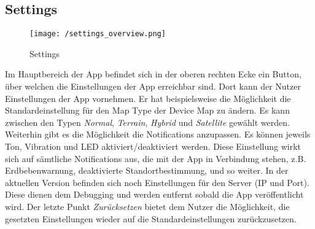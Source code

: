 \subsection{Settings}
\begin{wrapfigure}{r}{40mm}
\vspace{-5mm}
\texttt{[image: /settings\_overview.png]}
\vspace{-10mm}
\caption[User Interface: Settings]{Settings}
\vspace{-5mm}
\end{wrapfigure}
Im Hauptbereich der App befindet sich in der oberen rechten Ecke ein Button, über welchen die Einstellungen der App erreichbar sind. Dort kann der Nutzer Einstellungen der App vornehmen.
Er hat beispielsweise die Möglichkeit die Standardeinstellung für den Map Type der Device Map zu ändern. Es kann zwischen den Typen \textit{Normal}, \textit{Terrain}, \textit{Hybrid} und \textit{Satellite} gewählt werden. Weiterhin gibt es die Möglichkeit die Notifications anzupassen. Es können jeweils Ton, Vibration und LED aktiviert/deaktiviert werden. Diese Einstellung wirkt sich auf sämtliche Notifications aus, die mit der App in Verbindung stehen, z.B. Erdbebenwarnung, deaktivierte Standortbestimmung, und so weiter.
In der aktuellen Version befinden sich noch Einstellungen für den Server (IP und Port). Diese dienen dem Debugging und werden entfernt sobald die App veröffentlicht wird.
Der letzte Punkt \textit{Zurücksetzen} bietet dem Nutzer die Möglichkeit, die gesetzten Einstellungen wieder auf die Standardeinstellungen zurückzusetzen.



